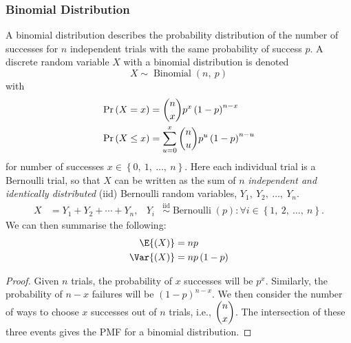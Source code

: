 \documentclass{article}
\begin{document}
\subsubsection{Binomial Distribution}
A binomial distribution describes the probability distribution of the
number of successes for \(n\) independent trials with the same
probability of success \(p\). A discrete random variable \(X\) with a
binomial distribution is denoted
\begin{equation*}
    X \sim \operatorname{Binomial}{\left( n,\: p \right)}
\end{equation*}
with
\begin{align*}
    \Pr{\left( X = x \right)}    & = \dbinom{n}{x} p^x \left( 1 - p \right)^{n - x}                \\
    \Pr{\left( X \leq x \right)} & = \sum_{u = 0}^x \dbinom{n}{u} p^u \left( 1 - p \right)^{n - u}
\end{align*}
for number of successes \(x \in \left\{ 0,\: 1,\: \dots,\: n \right\}\).
Here each individual trial is a Bernoulli trial, so that \(X\) can be
written as the sum of \(n\) \textit{independent and identically
    distributed} (iid) Bernoulli random variables, \(Y_1,\: Y_2,\: \dots,\:
Y_n\).
\begin{align*}
    X & = Y_1 + Y_2 + \cdots + Y_n, & Y_i & \overset{\mathrm{iid}}{\sim} \operatorname{Bernoulli}{\left( p \right)} : \forall i \in \left\{ 1,\: 2,\: \dots,\: n \right\}.
\end{align*}
We can then summarise the following:
\begin{align*}
    \E{\left( X \right)}   & = np                      \\
    \Var{\left( X \right)} & = np \left( 1 - p \right)
\end{align*}
\begin{proof}
    Given \(n\) trials, the probability of \(x\) successes will be \(p^x\).
    Similarly, the probability of \(n - x\) failures will be \(\left( 1 - p \right)^{n - x}\).
    We then consider the number of ways to choose \(x\) successes out
    of \(n\) trials, i.e., \(\dbinom{n}{x}\). The intersection of these
    three events gives the PMF for a binomial distribution.
\end{proof}
\end{document}

